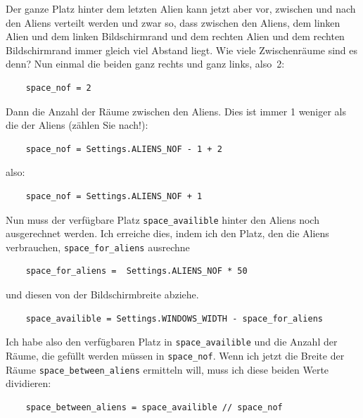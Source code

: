 

Der ganze Platz hinter dem letzten Alien kann jetzt aber vor, zwischen und nach den Aliens verteilt werden und zwar so, dass zwischen den Aliens, dem linken Alien und dem linken Bildschirmrand und dem rechten Alien und dem rechten Bildschirmrand immer gleich viel Abstand liegt. Wie viele Zwischenräume sind es denn? Nun einmal die beiden ganz rechts und ganz links, also~2:

\lstset{firstnumber=30}
\begin{lstlisting}
	space_nof = 2  
\end{lstlisting}

Dann die Anzahl der Räume zwischen den Aliens. Dies ist immer 1 weniger als die der Aliens (zählen Sie nach!):

\lstset{firstnumber=30}
\begin{lstlisting}
	space_nof = Settings.ALIENS_NOF - 1 + 2
\end{lstlisting}

also:

\lstset{firstnumber=30}
\begin{lstlisting}
	space_nof = Settings.ALIENS_NOF + 1     
\end{lstlisting}

Nun muss der verfügbare Platz \texttt{space\_availible} hinter den Aliens noch ausgerechnet werden. Ich erreiche dies, indem ich den Platz, den die Aliens verbrauchen, \texttt{space\_\-for\_\-a\-liens} ausrechne

\lstset{firstnumber=28}
\begin{lstlisting}
	space_for_aliens =  Settings.ALIENS_NOF * 50     
\end{lstlisting}

und diesen von der Bildschirmbreite abziehe.
\lstset{firstnumber=29}
\begin{lstlisting}
	space_availible = Settings.WINDOWS_WIDTH - space_for_aliens
\end{lstlisting}

Ich habe also den verfügbaren Platz in \texttt{space\_availible} und die Anzahl der Räume, die gefüllt werden müssen in \texttt{space\_nof}. Wenn ich jetzt die Breite der Räume \texttt{space\_between\_\-aliens} ermitteln will, muss ich diese beiden Werte dividieren:

\lstset{firstnumber=31}
\begin{lstlisting}
	space_between_aliens = space_availible // space_nof
\end{lstlisting}

